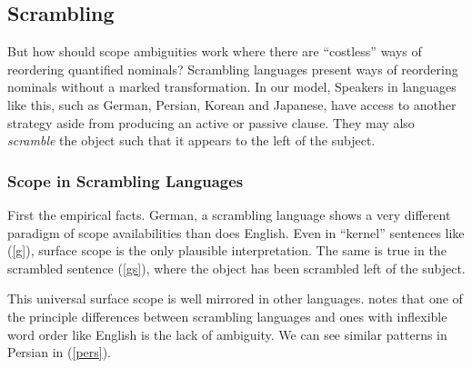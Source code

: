 \documentclass{article}
\begin{document}
\begin{exe}
\end{exe}



\subsection{Scrambling\label{scramb}}

But how should scope ambiguities work where there are ``costless'' ways of reordering quantified nominals? Scrambling languages present ways of reordering nominals without a marked transformation. In our model, Speakers in languages like this, such as German, Persian, Korean and Japanese, have access to another strategy aside from producing an active or passive clause. They may also \emph{scramble} the object such that it appears to the left of the subject.

\subsubsection{Scope in Scrambling Languages}

First the empirical facts. German, a scrambling language shows a very different paradigm of scope availabilities than does English. Even in ``kernel'' sentences like (\ref{g}), surface scope is the only plausible interpretation. The same is true in the scrambled sentence (\ref{gs}), where the object has been scrambled left of the subject.

\begin{exe}
\end{exe}

This universal surface scope is well mirrored in other languages. \textcite{karimi03} notes that one of the principle differences between scrambling languages and ones with inflexible word order like English is the lack of ambiguity. We can see similar patterns in Persian in (\ref{pers}).
\end{document}
